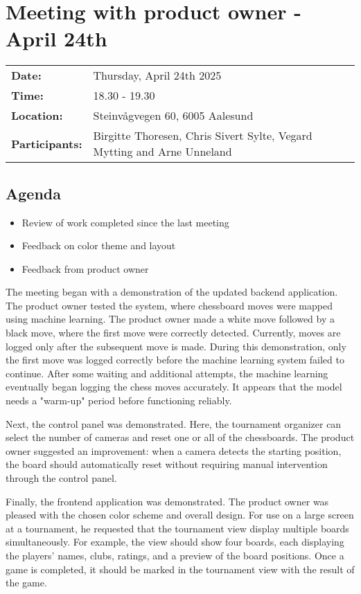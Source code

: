 \section{Meeting with product owner - April 24th}
\begin{tabular}{ll}
    \textbf{Date:} & Thursday, April 24th 2025 \\
    \textbf{Time:} & 18.30 - 19.30\\
    \textbf{Location:} & Steinvågvegen 60, 6005 Aalesund \\
    \textbf{Participants:} & Birgitte Thoresen, Chris Sivert Sylte, Vegard Mytting and Arne Unneland\\
\end{tabular}

\vspace{0.5cm}

\subsection{Agenda}

\begin{itemize} 
    \item Review of work completed since the last meeting
    \item Feedback on color theme and layout
    \item Feedback from product owner 
\end{itemize}

The meeting began with a demonstration of the updated backend application. The product owner tested the system, where chessboard moves were mapped using machine learning. The product owner made a white move followed by a black move, where the first move were correctly detected. Currently, moves are logged only after the subsequent move is made. During this demonstration, only the first move was logged correctly before the machine learning system failed to continue. After some waiting and additional attempts, the machine learning eventually began logging the chess moves accurately. It appears that the model needs a "warm-up" period before functioning reliably.

Next, the control panel was demonstrated. Here, the tournament organizer can select the number of cameras and reset one or all of the chessboards. The product owner suggested an improvement: when a camera detects the starting position, the board should automatically reset without requiring manual intervention through the control panel. 

Finally, the frontend application was demonstrated. The product owner was pleased with the chosen color scheme and overall design. For use on a large screen at a tournament, he requested that the tournament view display multiple boards simultaneously. For example, the view should show four boards, each displaying the players' names, clubs, ratings, and a preview of the board positions. Once a game is completed, it should be marked in the tournament view with the result of the game.


